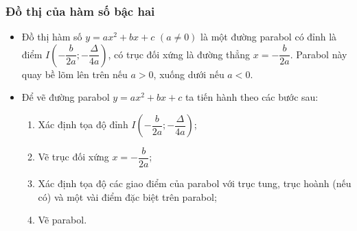 \subsubsection{Đồ thị của hàm số bậc hai}
\begin{boxdn}
	\begin{itemize}
		\item Đồ thị hàm số $y = ax^2 + bx + c $ $(a \neq 0)$ là một đường parabol có đỉnh là điểm $I\left(-\dfrac{b}{2a}; -\dfrac{\Delta}{4a}\right)$,
		có trục đối xứng là đường thẳng $x = -\dfrac{b}{2a}$. Parabol này quay bề lõm lên trên nếu $a > 0$,
		xuống dưới nếu $a < 0$.
		\item Để vẽ đường parabol $y = ax^2 + bx + c$ ta tiến hành theo các bước sau:
		\begin{enumerate}[Bước 1.]
			\item Xác định tọa độ đỉnh $I\left(-\dfrac{b}{2a}; -\dfrac{\Delta}{4a}\right)$;
			\item Vẽ trục đối xứng $x = -\dfrac{b}{2a}$;
			\item Xác định tọa độ các giao điểm của parabol với trục tung, trục hoành (nếu có) và một vài điểm đặc biệt trên parabol;
			\item Vẽ parabol.
		\end{enumerate}
	\end{itemize}
\end{boxdn}
